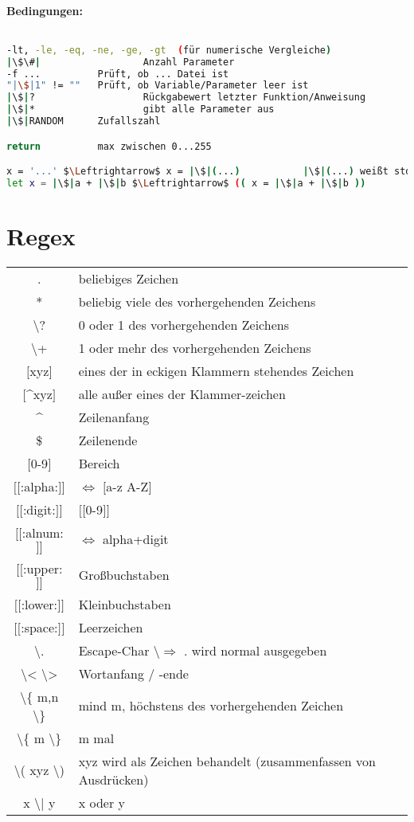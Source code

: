 \documentclass{scrreprt}
\begin{document}
\paragraph{Bedingungen:} $ $
\begin{lstlisting}[language=bash]
-lt, -le, -eq, -ne, -ge, -gt  (für numerische Vergleiche)
|\$\#|					Anzahl Parameter
-f ...			Prüft, ob ... Datei ist
"|\$|1" != ""	Prüft, ob Variable/Parameter leer ist
|\$|?					Rückgabewert letzter Funktion/Anweisung
|\$|*					gibt alle Parameter aus
|\$|RANDOM		Zufallszahl

return			max zwischen 0...255

x = '...' $\Leftrightarrow$ x = |\$|(...)			|\$|(...) weißt stdout einer Fkt einer Variablen zu
let x = |\$|a + |\$|b $\Leftrightarrow$ (( x = |\$|a + |\$|b ))
\end{lstlisting}

\section{Regex}
\begin{tabular}{c l}
. & beliebiges Zeichen\\
* & beliebig viele des vorhergehenden Zeichens\\
\textbackslash ? & 0 oder 1 des vorhergehenden Zeichens\\
\textbackslash + & 1 oder mehr des vorhergehenden Zeichens\\
$[$xyz$]$ & eines der in eckigen Klammern stehendes Zeichen\\
$[$\^{}xyz$]$ & alle außer eines der Klammer-zeichen\\
\^{} & Zeilenanfang\\
\$ & Zeilenende\\
$[$0-9$]$ & Bereich\\
$[[$:alpha:$]]$ & $\Leftrightarrow$ $[$a-z A-Z$]$\\
$[[$:digit:$]]$ & $[[$0-9$]]$\\
$[[$:alnum:$]]$ & $\Leftrightarrow$ alpha+digit\\
$[[$:upper:$]]$ & Großbuchstaben\\
$[[$:lower:$]]$ & Kleinbuchstaben\\
$[[$:space:$]]$ & Leerzeichen\\
\textbackslash . & Escape-Char \textbackslash $\Rightarrow$ . wird normal ausgegeben\\
\textbackslash < \textbackslash > & Wortanfang / -ende\\
\textbackslash \{ m,n \textbackslash \} & mind m, höchstens des vorhergehenden Zeichen\\
\textbackslash \{ m \textbackslash \} & m mal\\
\textbackslash ( xyz \textbackslash ) & xyz wird als Zeichen behandelt (zusammenfassen von Ausdrücken)\\
x \textbackslash | y & x oder y\\
\end{tabular}
\end{document}
